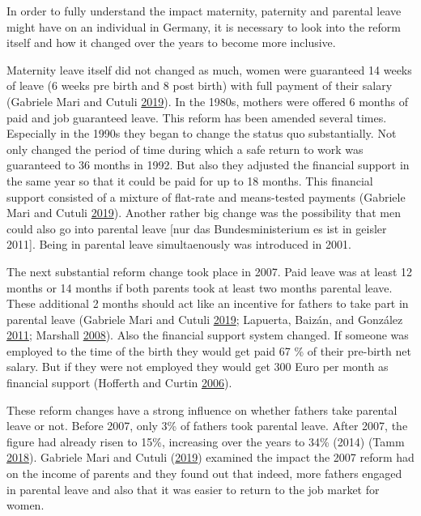 \documentclass[
  12pt,
]{article}
\begin{document}
In order to fully understand the impact maternity, paternity and parental leave might have on an individual in Germany, it is necessary to look into the reform itself and how it changed over the years to become more inclusive.

Maternity leave itself did not changed as much, women were guaranteed 14 weeks of leave (6 weeks pre birth and 8 post birth) with full payment of their salary (Gabriele Mari and Cutuli \protect\hyperlink{ref-gabriele_mari_parental_2019}{2019}). In the 1980s, mothers were offered 6 months of paid and job guaranteed leave. This reform has been amended several times. Especially in the 1990s they began to change the status quo substantially. Not only changed the period of time during which a safe return to work was guaranteed to 36 months in 1992. But also they adjusted the financial support in the same year so that it could be paid for up to 18 months. This financial support consisted of a mixture of flat-rate and means-tested payments (Gabriele Mari and Cutuli \protect\hyperlink{ref-gabriele_mari_parental_2019}{2019}). Another rather big change was the possibility that men could also go into parental leave {[}nur das Bundesministerium es ist in geisler 2011{]}. Being in parental leave simultaenously was introduced in 2001.

The next substantial reform change took place in 2007. Paid leave was at least 12 months or 14 months if both parents took at least two months parental leave. These additional 2 months should act like an incentive for fathers to take part in parental leave (Gabriele Mari and Cutuli \protect\hyperlink{ref-gabriele_mari_parental_2019}{2019}; Lapuerta, Baizán, and González \protect\hyperlink{ref-lapuerta_individual_2011}{2011}; Marshall \protect\hyperlink{ref-marshall_fathers_2008}{2008}). Also the financial support system changed. If someone was employed to the time of the birth they would get paid 67 \% of their pre-birth net salary. But if they were not employed they would get 300 Euro per month as financial support (Hofferth and Curtin \protect\hyperlink{ref-hofferth_parental_2006}{2006}).

These reform changes have a strong influence on whether fathers take parental leave or not. Before 2007, only 3\% of fathers took parental leave. After 2007, the figure had already risen to 15\%, increasing over the years to 34\% (2014) (Tamm \protect\hyperlink{ref-tamm_fathers_2018}{2018}).
Gabriele Mari and Cutuli (\protect\hyperlink{ref-gabriele_mari_parental_2019}{2019}) examined the impact the 2007 reform had on the income of parents and they found out that indeed, more fathers engaged in parental leave and also that it was easier to return to the job market for women.
\end{document}
